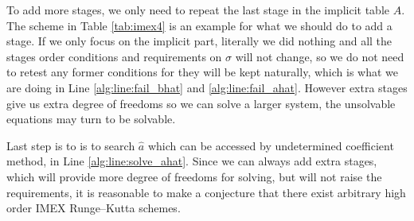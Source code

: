 \documentclass[a4paper, oneside]{book}
\def\hata{{\hat{a}}}
\def\hatA{{\hat{A}}}
\def\hatb{{\hat{b}}}
\begin{document}
To add more stages, we only need to repeat the last stage in the implicit 
table $A$. The scheme in Table \ref{tab:imex4} is an example for what we 
should do to add a stage. If we only focus on the implicit part, 
literally we did nothing and all the stages order conditions and requirements on $\sigma$ 
will not change, so we do not need to retest any former conditions for they will be kept 
naturally, which is what we are doing in Line \ref{alg:line:fail_bhat} and \ref{alg:line:fail_ahat}. 
However extra stages give us extra degree of freedoms so we can solve a larger system, 
the unsolvable equations may turn to be solvable. 

Last step is to is to search $\hata$ which can be accessed by undetermined coefficient method, 
in Line \ref{alg:line:solve_ahat}. 
Since we can always add extra stages, which will provide more degree of freedoms for solving, 
but will not raise the requirements, it is reasonable to make a conjecture 
that there exist arbitrary high order IMEX Runge--Kutta schemes.





\end{document}
